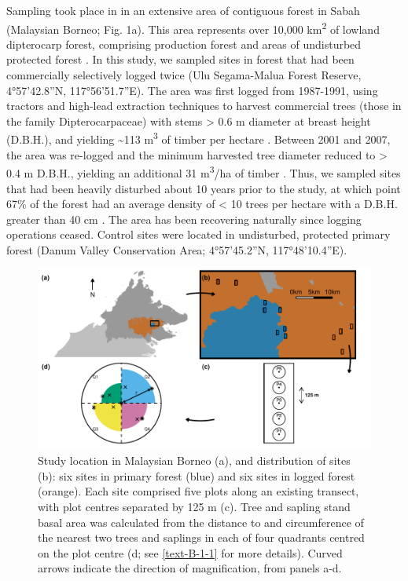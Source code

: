 \documentclass[12pt,a4paper,]{report}
\theoremstyle{definition}
\theoremstyle{definition}
\theoremstyle{definition}
\theoremstyle{remark}
\begin{document}
Sampling took place in in an extensive area of contiguous forest in
Sabah (Malaysian Borneo; Fig. 1a). This area represents over 10,000
km\textsuperscript{2} of lowland dipterocarp forest, comprising
production forest and areas of undisturbed protected forest
\citep{reynolds_changes2011}. In this study, we sampled sites in forest
that had been commercially selectively logged twice (Ulu Segama-Malua
Forest Reserve, 4°57'42.8''N, 117°56'51.7''E). The area was first logged
from 1987-1991, using tractors and high-lead extraction techniques to
harvest commercial trees (those in the family Dipterocarpaceae) with
stems \textgreater{} 0.6 m diameter at breast height (D.B.H.), and
yielding \textasciitilde{}113 m\textsuperscript{3} of timber per hectare
\citep{fisher_cost-effective2011, edwards_selective-logging2014}.
Between 2001 and 2007, the area was re-logged and the minimum harvested
tree diameter reduced to \textgreater{} 0.4 m D.B.H., yielding an
additional 31 m\textsuperscript{3}/ha of timber
\citep{fisher_cost-effective2011}. Thus, we sampled sites that had been
heavily disturbed about 10 years prior to the study, at which point 67\%
of the forest had an average density of \textless{} 10 trees per hectare
with a D.B.H. greater than 40 cm \citep{reynolds_changes2011}. The area
has been recovering naturally since logging operations ceased. Control
sites were located in undisturbed, protected primary forest (Danum
Valley Conservation Area; 4°57'45.2''N, 117°48'10.4''E).

\begin{figure}

{\centering \includegraphics{./output/fig-4-1-1} 

}

\caption{Study location in Malaysian Borneo (a), and distribution of sites (b): six sites in primary forest (blue) and six sites in logged forest (orange). Each site comprised five plots along an existing transect, with plot centres separated by 125 m (c). Tree and sapling stand basal area was calculated from the distance to and circumference of the nearest two trees and saplings in each of four quadrants centred on the plot centre (d; see \autoref{text-B-1-1} for more details). Curved arrows indicate the direction of magnification, from panels a-d.}\label{fig:fig-4-1}
\end{figure}
\end{document}
